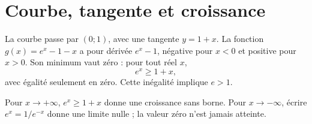\documentclass[../cours_1re.tex]{subfiles}
\begin{document}
\section{Courbe, tangente et croissance}
La courbe passe par $(0;1)$, avec une tangente $y=1+x$. La fonction
$g(x)=e^x-1-x$ a pour dérivée $e^x-1$, négative pour $x<0$ et positive pour $x>0$.
Son minimum vaut zéro : pour tout réel $x$,
\[
e^x\ge1+x,
\]
avec égalité seulement en zéro. Cette inégalité implique $e>1$.
\begin{center}\end{center}
Pour $x\to+\infty$, $e^x\ge1+x$ donne une croissance sans borne. Pour $x\to-\infty$, écrire $e^x=1/e^{-x}$ donne une limite nulle ; la valeur zéro n'est jamais atteinte.
\end{document}
